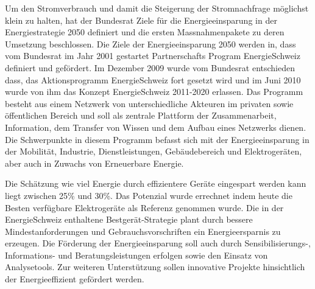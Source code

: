Um den Stromverbrauch und damit die Steigerung der Stromnachfrage möglichst klein zu halten, hat der Bundesrat Ziele für die Energieeinsparung in der Energiestrategie 2050 definiert und die ersten Massnahmenpakete zu deren Umsetzung beschlossen. Die Ziele der Energieeinsparung 2050 werden in, dass vom Bundesrat im Jahr 2001 gestartet Partnerschafts Program EnergieSchweiz definiert und gefördert. Im Dezember 2009 wurde vom Bundesrat entschieden dass, das Aktionsprogramm EnergieSchweiz fort gesetzt wird und im Juni 2010 wurde von ihm das Konzept EnergieSchweiz 2011-2020 erlassen. Das Programm besteht aus einem Netzwerk von unterschiedliche Akteuren im privaten sowie öffentlichen Bereich und soll als zentrale Plattform der Zusammenarbeit, Information, dem Transfer von Wissen und dem Aufbau eines Netzwerks dienen. Die Schwerpunkte in diesem Programm befasst sich mit der Energieeinsparung in der Mobilität, Industrie, Dienstleistungen, Gebäudebereich und Elektrogeräten, aber auch in Zuwachs von Erneuerbare Energie. 
\par
Die Schätzung wie viel Energie durch effizientere Geräte eingespart werden kann liegt zwischen 25\% und 30\%. Das Potenzial wurde errechnet indem heute die Besten verfügbare Elektrogeräte als Referenz genommen wurde. Die in der EnergieSchweiz enthaltene Bestgerät-Strategie plant durch bessere Mindestanforderungen und Gebrauchsvorschriften ein Energieersparnis zu erzeugen. Die Förderung der Energieeinsparung soll auch durch Sensibilisierungs-, Informations- und Beratungsleistungen erfolgen sowie den Einsatz von Analysetools. Zur weiteren Unterstützung sollen innovative Projekte hinsichtlich der Energieeffizient gefördert werden.






